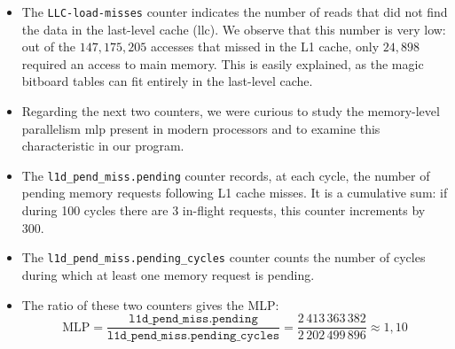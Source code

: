 \documentclass[12pt,a4paper,twoside,openright]{book}
\begin{document}
\begin{itemize}
\item The \texttt{LLC-load-misses} counter indicates the number of reads that did not find the data in the last-level cache (\gls{llc}). We observe that this number is very low: out of the $147{,}175{,}205$ accesses that missed in the L1 cache, only $24{,}898$ required an access to main memory. This is easily explained, as the magic bitboard tables can fit entirely in the last-level cache.
\item Regarding the next two counters, we were curious to study the memory-level parallelism \gls{mlp} present in modern processors and to examine this characteristic in our program.
\item The \texttt{l1d\_pend\_miss.pending} counter records, at each cycle, the number of pending memory requests following L1 cache misses. It is a cumulative sum: if during 100 cycles there are 3 in-flight requests, this counter increments by 300.
\item The \texttt{l1d\_pend\_miss.pending\_cycles} counter counts the number of cycles during which at least one memory request is pending.
\item The ratio of these two counters gives the MLP:
\[
\text{MLP} = \frac{\texttt{l1d\_pend\_miss.pending}}{\texttt{l1d\_pend\_miss.pending\_cycles}} = \frac{2\,413\,363\,382}{2\,202\,499\,896} \approx 1{,}10
\]

\end{itemize}
\end{document}

